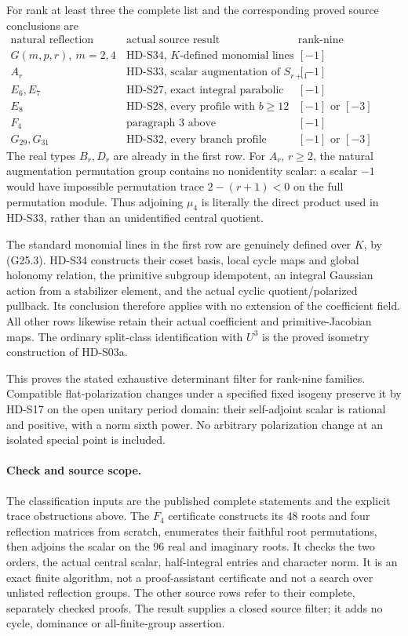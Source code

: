 For rank at least three the complete list and the corresponding
proved source conclusions are
\[
\begin{array}{c|l|l}
\text{natural reflection type}&\text{actual source result}
                    &\text{rank-nine determinant}\\ \hline
G(m,p,r),\ m=2,4 &\text{HD-S34, \(K\)-defined monomial lines}&[-1]\\
A_r &\text{HD-S33, scalar augmentation of \(S_{r+1}\)}&[-1]\\
E_6,E_7 &\text{HD-S27, exact integral parabolic maps}&[-1]\\
E_8 &\text{HD-S28, every profile with \(b\ge12\)}&[-1]\text{ or }[-3]\\
F_4 &\text{paragraph 3 above}&[-1]\\
G_{29},G_{31}&\text{HD-S32, every branch profile}&[-1]\text{ or }[-3]
\end{array}                                                  \tag{G25.6}
\]
The real types \(B_r,D_r\) are already in the first row.
For \(A_r\), \(r\ge2\), the natural augmentation permutation
group contains no nonidentity scalar: a scalar \(-1\)
would have impossible permutation trace \(2-(r+1)<0\)
on the full permutation module. Thus adjoining \(\mu_4\)
is literally the direct product used in HD-S33, rather
than an unidentified central quotient.

The standard monomial lines in the first row are genuinely
defined over \(K\), by (G25.3). HD-S34 constructs their
coset basis, local cycle maps and global holonomy relation,
the primitive subgroup idempotent, an integral Gaussian
action from a stabilizer element, and the actual cyclic
quotient/polarized pullback. Its conclusion therefore
applies with no extension of the coefficient field.
All other rows likewise retain their actual coefficient
and primitive-Jacobian maps. The ordinary split-class
identification with \(U^3\) is the proved isometry
construction of HD-S03a.

This proves the stated exhaustive determinant filter for
rank-nine families. Compatible flat-polarization changes
under a specified fixed isogeny preserve it by HD-S17 on
the open unitary period domain: their self-adjoint scalar
is rational and positive, with a norm sixth power.
No arbitrary polarization change at an isolated special
point is included.

\paragraph{Check and source scope.}
The classification inputs are the published complete
statements and the explicit trace obstructions above.
The \(F_4\) certificate 
constructs its 48 roots and four reflection matrices from
scratch, enumerates their faithful root permutations,
then adjoins the scalar on the 96 real and imaginary
roots. It checks the two orders, the actual central
scalar, half-integral entries and character norm.
It is an exact finite algorithm, not a proof-assistant
certificate and not a search over unlisted reflection groups.
The other source rows refer to their complete, separately
checked proofs. The result supplies a closed source filter;
it adds no cycle, dominance or all-finite-group assertion.
